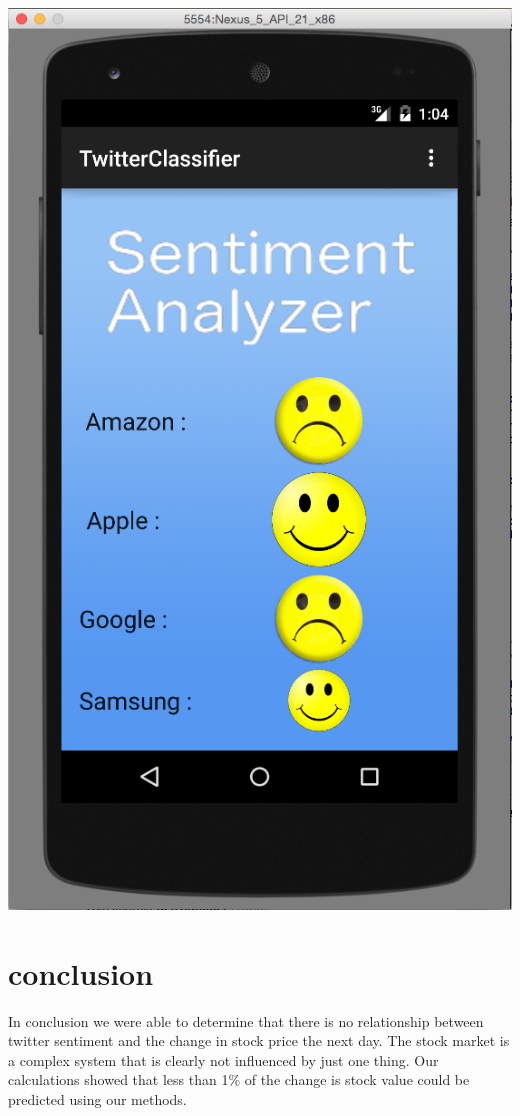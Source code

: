 \documentclass{acm_proc_article-sp}
\begin{document}
\begin{doublespace}
\includegraphics[width=\linewidth]{android.png}

\section{conclusion}

In conclusion we were able to determine that there is no relationship between
twitter sentiment and the change in stock price the next day. The stock market
is a complex system that is clearly not influenced by just one thing. Our calculations
showed that less than 1\% of the change is stock value could be predicted using our
methods. 


\end{doublespace}
\end{document}
